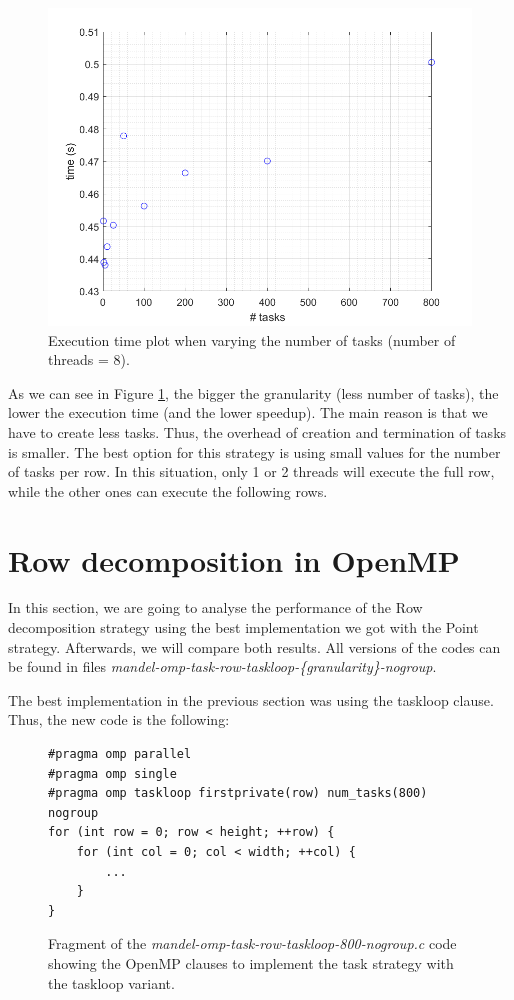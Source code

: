 \documentclass[12pt, a4paper]{article}
\begin{document}
\begin{figure}[H]
  \centering
  \includegraphics[scale=0.5]{./num_task_point}
  \caption{Execution time plot when varying the number of tasks (number of threads = 8).}
  \label{fig:num_task_point}
\end{figure}

As we can see in Figure \ref{fig:num_task_point}, the bigger the granularity (less number of tasks), the lower the execution time (and the lower speedup). The main reason is that we have to create less tasks. Thus, the overhead of creation and termination of tasks is smaller. The best option for this strategy is using small values for the number of tasks per row. In this situation, only 1 or 2 threads will execute the full row, while the other ones can execute the following rows.

\section{Row decomposition in OpenMP}

In this section, we are going to analyse the performance of the Row decomposition strategy using the best implementation we got with the Point strategy. Afterwards, we will compare both results. All versions of the codes can be found in files \textit{mandel-omp-task-row-taskloop-\{granularity\}-nogroup}.

The best implementation in the previous section was using the taskloop clause. Thus, the new code is the following:

\begin{figure}[H]
\begin{lstlisting}
#pragma omp parallel
#pragma omp single
#pragma omp taskloop firstprivate(row) num_tasks(800) nogroup
for (int row = 0; row < height; ++row) {
    for (int col = 0; col < width; ++col) {
        ...
	}
}
\end{lstlisting}
\caption{Fragment of the \textit{mandel-omp-task-row-taskloop-800-nogroup.c} code showing the OpenMP clauses to implement the task strategy with the taskloop variant.}
\label{code:task_implementation_row_taskloop_800}
\end{figure}
\end{document}
